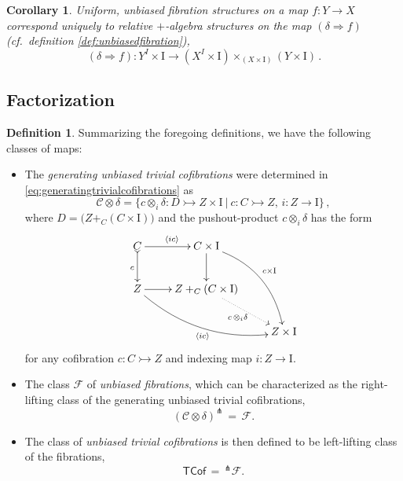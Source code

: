 \documentclass[11pt,reqno]{amsart}
\newcommand{\mono}{\ensuremath{\rightarrowtail}}
\newcommand{\ra}{\ensuremath{\rightarrow}}
\newcommand{\too}{\ensuremath{\longrightarrow}}
\newcommand{\gph}[1]{\ensuremath{\langle #1 \rangle}}
\newcommand{\I}{\ensuremath{\mathrm{I}}}
\newtheorem{corollary}[theorem]{Corollary}
\theoremstyle{remark}
\theoremstyle{definition}
\newtheorem{definition}[theorem]{Definition}
\begin{document}
\begin{corollary}
Uniform, unbiased fibration structures on a map $f : Y\ra X$ correspond uniquely to relative $+$-algebra structures on the map $(\delta\Rightarrow{f})$ (cf.\ definition \ref{def:unbiasedfibration}),
\[
(\delta\Rightarrow{f}) : Y^I\times \I \too (X^I \times \I)\times_{(X\times \I)} (Y\times\I)\,.
\]
\end{corollary}

\subsection*{Factorization}\label{subsec:FWFS}

\begin{definition}\label{def:FibWFSclasses}
Summarizing the foregoing definitions, we have the following classes of maps:

\begin{itemize}
\item  The \emph{generating unbiased trivial cofibrations} were determined in \eqref{eq:generatingtrivialcofibrations} as
\begin{equation}\label{eq:genunbiasedTCof}
\mathcal{C}\otimes\delta = \{c \otimes_i \delta : D \mono Z\times\I\ |\  c : C\mono Z,\, i : Z \ra \I\}\,,
\end{equation}
where $D = \big(Z +_C (C\times\I)\big)$ and the pushout-product $c\otimes_i \delta$ has the form
\begin{equation}\label{diagram:unbiasedbasicpushoutproduct2}
\xymatrix{
C \ar@{>->}[d]_{c} \ar[r]^{\gph{ic}} & C\times \I \ar[d] \ar@/^4ex/ [rdd]^{c\times\I}\\
Z \ar@/_4ex/ [rrd]_{\gph{ic}} \ar[r] &  Z +_C (C\times\I) \ar@{.>}[rd]_{c\, \otimes_i \delta} \\
&& Z\times\I
}
\end{equation}
for any cofibration $c : C\mono Z$ and indexing map $i: Z \ra \I$.

\item The class $\mathcal{F}$ of \emph{unbiased fibrations}, which can be characterized as the right-lifting class of the generating unbiased trivial cofibrations,
\[
(\mathcal{C}\otimes\delta)^\pitchfork\, =\,\mathcal{F}.
\]

\item The class of \emph{unbiased trivial cofibrations} is then defined to be left-lifting class of the fibrations,
\[
\mathsf{TCof}\, =\, ^{\pitchfork}\mathcal{F}.
\]
\end{itemize}
\end{definition}
\end{document}
